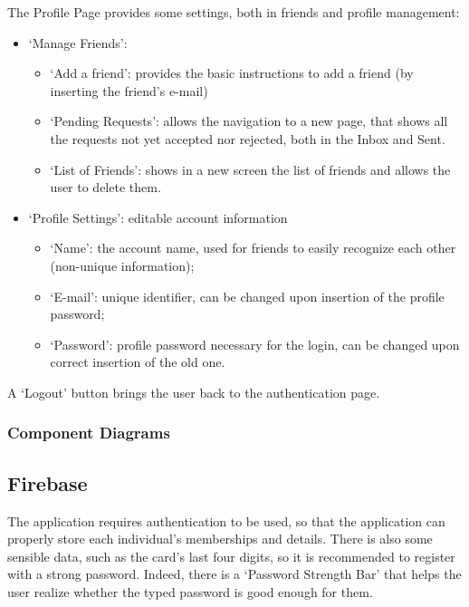 \documentclass[11pt]{article}
\begin{document}
\vspace{0.5cm}
\vspace{0.2cm}

\noindent The Profile Page provides some settings, both in friends and profile management: \begin{itemize}
    \item `Manage Friends':
          \begin{itemize}
              \item `Add a friend': provides the basic instructions to add a friend (by inserting the friend's e-mail)
              \item `Pending Requests': allows the navigation to a new page, that shows all the requests not yet accepted nor rejected, both in the Inbox and Sent.
              \item `List of Friends': shows in a new screen the list of friends and allows the user to delete them.
          \end{itemize}
    \item `Profile Settings': editable account information
          \begin{itemize}
              \item `Name': the account name, used for friends to easily recognize each other (non-unique information);
              \item `E-mail': unique identifier, can be changed upon insertion of the profile password;
              \item `Password': profile password necessary for the login, can be changed upon correct insertion of the old one.
          \end{itemize}
\end{itemize}

A `Logout' button brings the user back to the authentication page.

\subsubsection{Component Diagrams}

\subsection{Firebase}
The application requires authentication to be used, so that the application can properly store each individual's memberships and details. There is also some sensible data, such as the card's last four digits, so it is recommended to register with a strong password. Indeed, there is a `Password Strength Bar' that helps the user realize whether the typed password is good enough for them.
\end{document}
